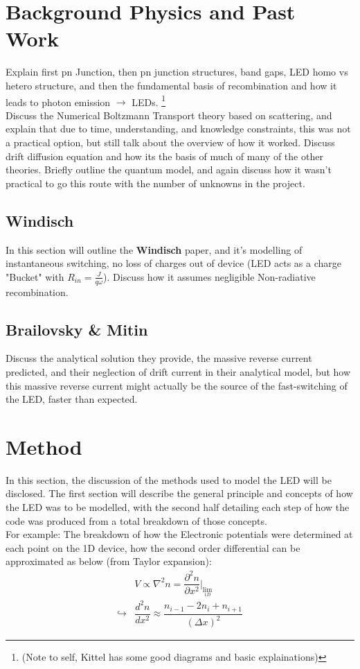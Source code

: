 \documentclass[titlepage]{article}
\begin{document}
\section{Background Physics and Past Work}
Explain first pn Junction, then pn junction structures, band gaps, LED homo vs hetero structure, and then the fundamental basis of recombination and how it leads to photon emission $\rightarrow$ LEDs. \footnote{(Note to self, Kittel has some good diagrams and basic explainations)}\\
Discuss the Numerical Boltzmann Transport theory based on scattering, and explain that due to time, understanding, and knowledge constraints, this was not a practical option, but still talk about the overview of how it worked.
Discuss drift diffusion equation and how its the basis of much of many of the other theories.
Briefly outline the quantum model, and again discuss how it wasn't practical to go this route with the number of unknowns in the project.
\subsection{Windisch}
In this section will outline the \textbf{Windisch} paper, and it's modelling of instantaneous switching, no loss of charges out of device (LED acts as a charge "Bucket" with $R_{in} = \frac{J}{q\omega} $). Discuss how it assumes negligible Non-radiative recombination.
\subsection{Brailovsky \& Mitin}
Discuss the analytical solution they provide, the massive reverse current predicted, and their neglection of drift current in their analytical model, but how this massive reverse current might actually be the source of the fast-switching of the LED, faster than expected.
\section{Method}
In this section, the discussion of the methods used to model the LED will be disclosed. The first section will describe the general principle and concepts of how the LED was to be modelled, with the second half detailing each step of how the code was produced from a total breakdown of those concepts. \\ For example: The breakdown of how the Electronic potentials were determined at each point on the 1D device, how the second order differential can be approximated as below (from Taylor expansion):
\begin{eqnarray}
	&V \propto \nabla^2 n = \dfrac{\partial^2n}{\partial x^2}\Big|_{\lim\limits_{1D}} \\
	\hookrightarrow &\dfrac{d^2n}{dx^2} \approx \dfrac{n_{i-1} - 2n_i + n_{i+1}}{(\Delta x)^2}
\end{eqnarray}
\end{document}
